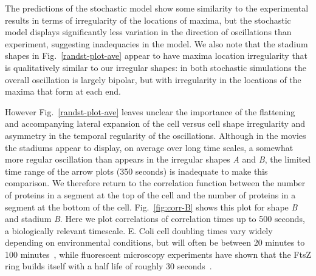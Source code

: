\documentclass[10pt,letterpaper]{article}
\newcommand{\fixme}[1]{\red{[#1]}}
\newcommand{\red}[1]{{\bf \color{red} #1}}
\begin{document}

The predictions of the stochastic model show some similarity to the
experimental results in terms of irregularity of the locations of
maxima, but the stochastic model displays significantly less
variation in the direction of oscillations than experiment, suggesting
inadequacies in the model.  We also note that the stadium shapes in
Fig.~\ref{randst-plot-ave} appear to have maxima location irregularity
that is qualitatively similar to our irregular shapes: in both
stochastic simulations the overall oscillation is largely bipolar, but
with irregularity in the locations of the maxima that form at each
end.

However Fig.~\ref{randst-plot-ave} leaves unclear the importance of
the flattening and accompanying lateral expansion of the cell versus
cell shape irregularity and asymmetry in the temporal regularity of
the oscillations.  Although in the movies the stadiums appear to
display, on average over long time scales, a somewhat more regular
oscillation than appears in the irregular shapes \emph{A} and
\emph{B}, the limited time range of the arrow plots (350 seconds) is
inadequate to make this comparison.  We therefore return to the
correlation function between the number of proteins in a segment at
the top of the cell and the number of proteins in a segment at the
bottom of the cell.  Fig.~\ref{fig:corr-B} shows this plot for shape
\emph{B} and stadium \emph{B}.  Here we plot correlations of
correlation times up to 500 seconds, a biologically relevant
timescale.  E. Coli cell doubling times vary widely depending on
environmental conditions, but will often be between 20 minutes to 100
minutes~\cite{pierucci1972chromosome}, while fluorescent microscopy
experiments have shown that the FtsZ ring builds itself with a half
life of roughly 30 seconds~\cite{stricker2002rapid}.
\end{document}
